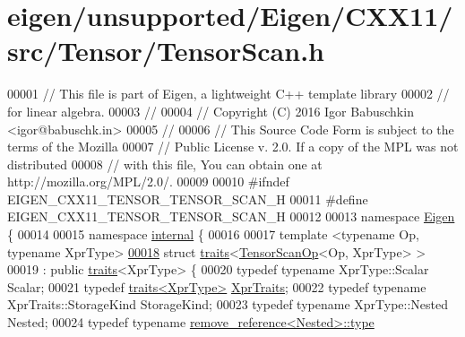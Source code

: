\hypertarget{eigen_2unsupported_2_eigen_2_c_x_x11_2src_2_tensor_2_tensor_scan_8h_source}{}\section{eigen/unsupported/\+Eigen/\+C\+X\+X11/src/\+Tensor/\+Tensor\+Scan.h}
\label{eigen_2unsupported_2_eigen_2_c_x_x11_2src_2_tensor_2_tensor_scan_8h_source}

\begin{DoxyCode}
00001 \textcolor{comment}{// This file is part of Eigen, a lightweight C++ template library}
00002 \textcolor{comment}{// for linear algebra.}
00003 \textcolor{comment}{//}
00004 \textcolor{comment}{// Copyright (C) 2016 Igor Babuschkin <igor@babuschk.in>}
00005 \textcolor{comment}{//}
00006 \textcolor{comment}{// This Source Code Form is subject to the terms of the Mozilla}
00007 \textcolor{comment}{// Public License v. 2.0. If a copy of the MPL was not distributed}
00008 \textcolor{comment}{// with this file, You can obtain one at http://mozilla.org/MPL/2.0/.}
00009 
00010 \textcolor{preprocessor}{#ifndef EIGEN\_CXX11\_TENSOR\_TENSOR\_SCAN\_H}
00011 \textcolor{preprocessor}{#define EIGEN\_CXX11\_TENSOR\_TENSOR\_SCAN\_H}
00012 
00013 \textcolor{keyword}{namespace }\hyperlink{namespace_eigen}{Eigen} \{
00014 
00015 \textcolor{keyword}{namespace }\hyperlink{namespaceinternal}{internal} \{
00016 
00017 \textcolor{keyword}{template} <\textcolor{keyword}{typename} Op, \textcolor{keyword}{typename} XprType>
\hyperlink{struct_eigen_1_1internal_1_1traits_3_01_tensor_scan_op_3_01_op_00_01_xpr_type_01_4_01_4}{00018} \textcolor{keyword}{struct }\hyperlink{struct_eigen_1_1internal_1_1traits}{traits}<\hyperlink{class_eigen_1_1_tensor_scan_op}{TensorScanOp}<Op, XprType> >
00019     : \textcolor{keyword}{public} \hyperlink{struct_eigen_1_1internal_1_1traits}{traits}<XprType> \{
00020   \textcolor{keyword}{typedef} \textcolor{keyword}{typename} XprType::Scalar Scalar;
00021   \textcolor{keyword}{typedef} \hyperlink{struct_eigen_1_1internal_1_1traits}{traits<XprType>} \hyperlink{struct_eigen_1_1internal_1_1traits}{XprTraits};
00022   \textcolor{keyword}{typedef} \textcolor{keyword}{typename} XprTraits::StorageKind StorageKind;
00023   \textcolor{keyword}{typedef} \textcolor{keyword}{typename} XprType::Nested Nested;
00024   \textcolor{keyword}{typedef} \textcolor{keyword}{typename} \hyperlink{group___sparse_core___module}{remove\_reference<Nested>::type} 

\end{DoxyCode}
